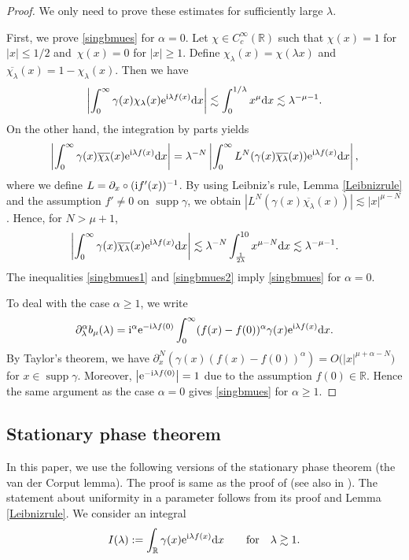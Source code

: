 \documentclass[11pt]{article}
\numberwithin{equation}{section}
\def\R{\mathbb{R}}%
\DeclareMathOperator{\supp}{supp}%
\def\a{\alpha}
\def\c{\gamma}
\def\l{\lambda}
\def\m{\mu}
\def\pa{\partial}
\begin{document}
\begin{proof}
We only need to prove these estimates for sufficiently large $\l$.

First, we prove \eqref{singbmues} for $\a=0$. Let $\chi\in C_c^{\infty}(\R)$ such that $\chi(x)=1$ for $|x|\leq 1/2$ and~${\chi(x)=0}$ for $|x|\geq 1$. Define $\chi_{\l}(x)=\chi(\l x)$ and $\overline{\chi_\l}(x)=1-\chi_{\l}(x)$. Then we have
\begin{align}\label{singbmues1}
\left|\int_{0}^{\infty}\c(x)\chi_{\l}(x){\rm e}^{{\rm i}\l f(x)}{\rm d}x\right|\lesssim \int_{0}^{1/\l}x^{\m}{\rm d}x\lesssim {\l}^{-\m-1}.
\end{align}
On the other hand, the integration by parts yields
\begin{align*}
\left|\int_{0}^{\infty}\c(x)\overline{\chi_{\l}}(x){\rm e}^{{\rm i}\l f(x)}{\rm d}x\right|=\l^{-N}\left|\int_{0}^{\infty}L^N(\c(x)\overline{\chi_{\l}}(x)){\rm e}^{{\rm i}\l f(x)}{\rm d}x\right|,
\end{align*}
where we define $L=\pa_x\circ ({\rm i}f'(x))^{-1}$. By using Leibniz's rule, Lemma \ref{Leibnizrule} and the assumption $f'\neq 0$ on $\supp \c$, we obtain $|L^{N}(\c(x)\overline{\chi_\l}(x))|\lesssim |x|^{\m-N}$. Hence, for $N>\m+1$,
\begin{align}\label{singbmues2}
\left|\int_{0}^{\infty}\c(x)\overline{\chi_{\l}}(x){\rm e}^{{\rm i}\l f(x)}{\rm d}x\right|\lesssim \l^{-N}\int_{\frac{1}{2\l}}^{10}x^{\m-N}{\rm d}x \lesssim \l^{-\m-1}.
\end{align}
The inequalities \eqref{singbmues1} and \eqref{singbmues2} imply \eqref{singbmues} for $\a=0$.

To deal with the case $\a\geq 1$, we write
\begin{align*}
\pa_{\l}^{\a}b_{\m}(\l)={\rm i}^{\a}{\rm e}^{-{\rm i}\l f(0)}\int_0^{\infty}(f(x)-f(0))^{\a}\c(x){\rm e}^{{\rm i}\l f(x)}{\rm d}x.
\end{align*}
By Taylor's theorem, we have $\pa_x^{N}(\c(x)(f(x)-f(0))^{\a})=O\bigl(|x|^{\m+\a-N}\bigr)$ for $x\in \supp \c$. Moreover, $\big|{\rm e}^{-{\rm i}\l f(0)}\big|=1$ due to the assumption $f(0)\in \R$.
Hence the same argument as the case $\a=0$ gives \eqref{singbmues} for $\a\geq 1$.
\end{proof}

\subsection{Stationary phase theorem}

In this paper, we use the following versions of the stationary phase theorem (the van der Corput lemma). The proof is same as the proof of \cite[Lemma 1.1.2]{So} (see also in \cite[p.~334]{S}). The statement about uniformity in a parameter follows from its proof and Lemma \ref{Leibnizrule}. We consider an integral
\begin{align*}
I(\l):=\int_{\R}\c(x){\rm e}^{{\rm i}\l f(x)}{\rm d}x\qquad \text{for}\quad \l\gtrsim 1.
\end{align*}
\end{document}
